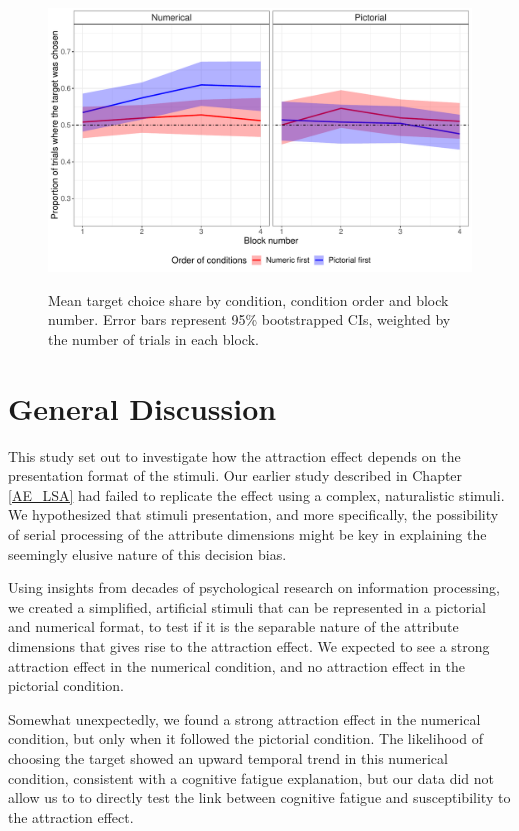 \documentclass[11pt,a4paper]{article}
\begin{document}
\begin{figure}
\centering
\caption{Mean target choice share by condition, condition order and block number. Error bars represent 95\% bootstrapped CIs, weighted by the number of trials in each block.}
\includegraphics[width=1\textwidth]{./Block_order.pdf}
\label{fig:Block_order}
\end{figure}


\section{General Discussion}

This study set out to investigate how the attraction effect depends on the presentation format of the stimuli. Our earlier study described in Chapter \ref{AE_LSA} had failed to replicate the effect using a complex, naturalistic stimuli. We hypothesized that stimuli presentation, and more specifically, the possibility of serial processing of the attribute dimensions might be key in explaining the seemingly elusive nature of this decision bias.

Using insights from decades of psychological research on information processing, we  created a simplified, artificial stimuli that can be represented in a pictorial and numerical format, to test if it is the separable nature of the attribute dimensions that gives rise to the attraction effect.  We expected to see a strong attraction effect in the numerical condition, and no attraction effect in the pictorial condition.

Somewhat unexpectedly, we found a strong attraction effect in the numerical condition, but only when it followed the pictorial condition. The likelihood of choosing the target showed an upward temporal trend in this numerical condition, consistent with a cognitive fatigue explanation, but our data did not allow us to to directly test the link between cognitive fatigue and susceptibility to the attraction effect.
\end{document}
